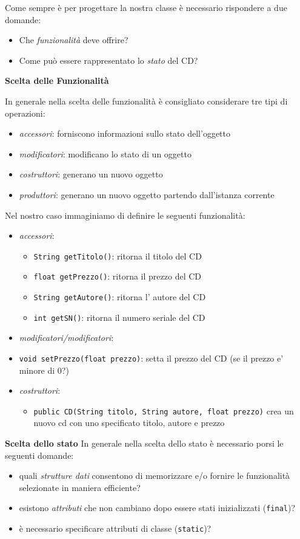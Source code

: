 \documentclass{article}
\begin{document}
Come sempre \`e per progettare la nostra classe \`e necessario rispondere a due domande:
\begin{itemize}
\item Che \emph{funzionalità} deve offrire?
\item Come può essere rappresentato lo \emph{stato} del CD?
\end{itemize}



\textbf{Scelta delle Funzionalit\`a}

In generale nella scelta delle funzionalit\`a \`e consigliato considerare tre tipi di operazioni:
\begin{itemize}
\item \emph{accessori}: forniscono informazioni sullo stato dell'oggetto
\item \emph{modificatori}: modificano lo stato di un oggetto
\item \emph{costruttori}: generano un nuovo oggetto
\item \emph{produttori}: generano un nuovo oggetto partendo dall'istanza corrente
\end{itemize}

Nel nostro caso immaginiamo di definire le seguenti funzionalit\`a:
\begin{itemize}
\item \emph{accessori}:
\begin{itemize}
\item \texttt{String getTitolo()}: ritorna il titolo del CD
\item \texttt{float getPrezzo()}: ritorna il prezzo del CD
\item \texttt{String getAutore()}: ritorna l' autore del CD
\item \texttt{int getSN()}: ritorna il numero seriale del CD
\end{itemize}
\item \emph{modificatori/modificatori}:
\item \texttt{void setPrezzo(float prezzo)}: setta il prezzo del CD (se il prezzo e' minore di 0?)
\item \emph{costruttori}:
\begin{itemize}
\item \texttt{public CD(String titolo, String autore, float prezzo)} crea un nuovo cd con uno specificato titolo, autore e prezzo
\end{itemize}
\end{itemize}


\textbf{Scelta dello stato}
In generale nella scelta dello stato \`e necessario porsi le seguenti domande:
\begin{itemize}
\item quali \emph{strutture dati} consentono di memorizzare e/o fornire le funzionalit\`a selezionate in maniera efficiente?
\item esistono \emph{attributi} che non cambiano dopo essere stati inizializzati (\texttt{final})?
\item \`e necessario specificare attributi di classe (\texttt{static})?
\end{itemize}
\end{document}
